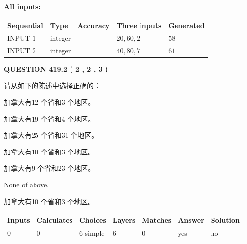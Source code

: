 \documentclass{ctexart}
\begin{document}
   
   
   
\noindent\vspace{0.1in}\hspace{-0.08in} {\textbf{\Large{All inputs: }}}
   
   
  
  
\noindent\begin{tabular}{|l|l|l|l|l|}
\hline
 Sequential & Type & Accuracy & Three inputs & Generated \\ 
\hline
 
 
  INPUT $  1 $ & integer &  & $
 20
 , 
 60
 , 
 2
 $ & $ 58 $ 
 \\  \hline  
 
 
  INPUT $  2 $ & integer &  & $
 40
 , 
 80
 , 
 7
 $ & $ 61 $ 
 \\  \hline  
 \end{tabular}
   
   
  
\vspace{0.2in}
  
{\textbf{\Large{QUESTION
419.2 
 ( 2 , 2 , 3 )
}}}
  
  
请从如下的陈述中选择正确的：
 
 
加拿大有12 个省和3 个地区。
 
 
加拿大有19 个省和4 个地区。
 
 
加拿大有25 个省和31 个地区。
 
 
加拿大有10 个省和3 个地区。
 
 
加拿大有9 个省和23 个地区。
 
 
 None of above.
 
 
\noindent{}
 
 
加拿大有10 个省和3 个地区。
 
 
\noindent{}
 
 
   
   
   
   
\noindent\begin{tabular}{|l|l|l|l|l|l|l|}
 \hline
Inputs & Calculates & Choices & Layers & Matches & Answer & Solution \\ \hline
 0  & 
 0  & 
 6
  simple  
  & 
 6  & 
 0  & 
  yes & 
  no 
  \\ \hline
 \end{tabular}
   
\end{document}
